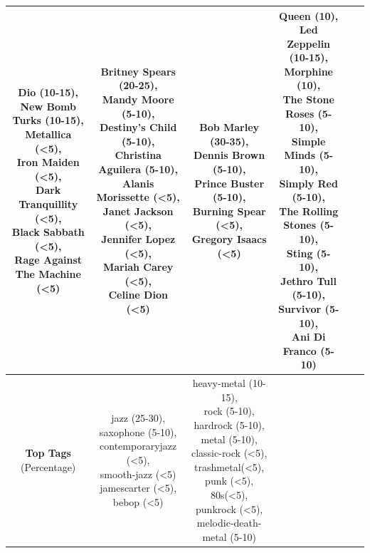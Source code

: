 \documentclass[english, LaM, oneside, noexaminfo]{sapthesis}
\begin{document}
\begin{table}[htbp]
{\begin{tabular}{|c|c|c|c|c|c|}
\makecell{Dio (10-15),\\New Bomb Turks (10-15),\\Metallica (<5),\\Iron Maiden (<5),\\ Dark Tranquillity (<5),\\Black Sabbath (<5),\\Rage Against The Machine (<5)} & 
\makecell{Britney Spears (20-25),\\Mandy Moore (5-10),\\Destiny's Child (5-10),\\Christina Aguilera (5-10),\\ Alanis Morissette (<5),\\Janet Jackson (<5),\\Jennifer Lopez (<5),\\ Mariah Carey (<5), \\ Celine Dion (<5)} & 
\makecell{Bob Marley (30-35),\\Dennis Brown (5-10),\\Prince Buster (5-10),\\Burning Spear (<5),\\ Gregory Isaacs (<5)} &
\makecell{Queen (10),\\Led Zeppelin (10-15),\\Morphine (10),\\The Stone Roses (5-10),\\ Simple Minds (5-10),\\Simply Red (5-10),\\The Rolling Stones (5-10),\\ Sting (5-10), \\ Jethro Tull (5-10),\\Survivor (5-10),\\Ani Di Franco (5-10)}\\
\hline
\rule[-4mm]{0mm}{1cm}
\makecell{{\bf Top Tags} \\ (Percentage)} & 
\makecell{jazz (25-30),\\saxophone (5-10),\\contemporaryjazz (<5),\\smooth-jazz (<5)\\jamescarter (<5),\\bebop (<5)} &
\makecell{heavy-metal (10-15),\\rock (5-10),\\hardrock (5-10),\\metal (5-10),\\classic-rock (<5),\\trashmetal(<5),\\punk (<5),\\80s(<5),\\punkrock (<5),\\melodic-death-metal (5-10)} &

\end{tabular}}
\end{table}
\end{document}
